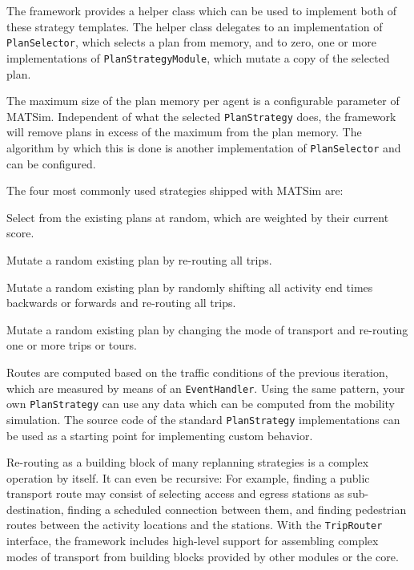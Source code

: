The framework provides a helper class which can be used to implement both of these strategy templates. 
The helper class delegates to an implementation of \lstinline|PlanSelector|, which selects a plan from memory, 
and to zero, one or more implementations of \lstinline|PlanStrategyModule|, which mutate a copy of the selected plan.

The maximum size of the plan memory per agent is a configurable parameter of MATSim. Independent
 of what the selected \lstinline|PlanStrategy| does, the framework will remove plans in excess
 of the maximum from the plan memory. The algorithm by which this is done is another implementation
 of \lstinline|PlanSelector| and can be configured. 

The four most commonly used strategies shipped with MATSim are:
\begin{compactitem}
\item Select from the existing plans at random, which are weighted by their current score.
\item Mutate a random existing plan by re-routing all trips.
\item Mutate a random existing plan by randomly shifting all activity end times backwards or forwards and re-routing 
all trips.
\item Mutate a random existing plan by changing the mode of transport and re-routing one or more trips or tours.
\end{compactitem}

Routes are computed based on the traffic conditions of the previous iteration, which are measured
by means of an \lstinline|EventHandler|. Using the same pattern, your own \lstinline|PlanStrategy| can use any data which
can be computed from the mobility simulation. The source code of the standard \lstinline|PlanStrategy| implementations can be 
used as a starting point for implementing custom behavior.

Re-routing as a building block of many replanning strategies is a complex operation by itself. It can
even be recursive: For example, finding a public transport route may consist of selecting access and egress stations as
sub-destination, finding a scheduled connection between them, and finding pedestrian routes between the
activity locations and the stations. With the \lstinline|TripRouter| interface, the framework includes high-level 
support for assembling complex modes of transport from building blocks provided by other modules or the core. 
  

